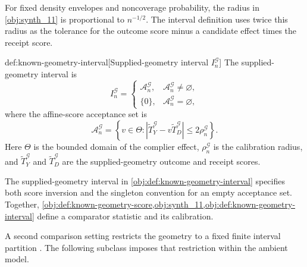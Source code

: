 \documentclass[11pt]{article}
\begin{document}
For fixed density envelopes and noncoverage probability, the radius  in \cref{obj:synth_11} is proportional to \(n^{-1/2}\). The interval definition uses twice this radius as the tolerance for the outcome score minus a candidate effect times the receipt score.

\begin{definitionv}{def:known-geometry-interval}[Supplied-geometry interval $I_n^{\mathcal G}$]
The supplied-geometry interval is
\[
I_n^{\mathcal G}
=
\begin{cases}
\mathcal A_n^{\mathcal G},&\mathcal A_n^{\mathcal G}\ne\varnothing,\\
\{0\},&\mathcal A_n^{\mathcal G}=\varnothing,
\end{cases}
\]
where the affine-score acceptance set is
\[
\mathcal A_n^{\mathcal G}
=
\left\{
v\in\Theta:
\left|\widetilde T_Y^{\mathcal G}
-v\widetilde T_D^{\mathcal G}\right|
\le 2\rho_n^{\mathcal G}
\right\}.
\]
Here \(\Theta\) is the bounded domain of the complier effect, \(\rho_n^{\mathcal G}\) is the calibration radius, and \(\widetilde T_Y^{\mathcal G}\) and \(\widetilde T_D^{\mathcal G}\) are the supplied-geometry outcome and receipt scores.
\end{definitionv}

The supplied-geometry interval  in \cref{obj:def:known-geometry-interval} specifies both score inversion and the singleton convention for an empty acceptance set. Together, \cref{obj:def:known-geometry-score,obj:synth_11,obj:def:known-geometry-interval} define a comparator statistic and its calibration.

A second comparison setting restricts the geometry to a fixed finite interval partition . The following subclass imposes that restriction within the ambient model.
\end{document}

